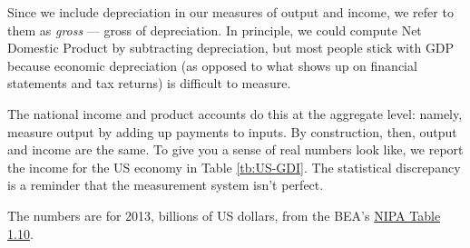 Since we include depreciation in our measures of output and income,
we refer to them as \textit{gross} --- gross of depreciation.
In principle, we could compute Net Domestic Product
by subtracting depreciation, but most people stick with GDP because
economic depreciation (as opposed to what shows up on financial
statements and tax returns) is difficult to measure.


The national income and product accounts do this at the aggregate level:
namely, measure output by adding up payments to inputs.
By construction, then, output and income are the same.
To give you a sense of real numbers look like, we report
the income for the US economy  in Table \ref{tb:US-GDI}.
The statistical discrepancy is a reminder that the measurement
system isn't perfect.

\begin{table}[!ht]
\centering
\caption{Income components of US GDP.}
\label{tb:US-GDI}

\begin{minipage}{0.7\textwidth}
\footnotesize{%
\smallskip
The numbers are for 2013, billions of US dollars,
from the BEA's
\href{http://www.bea.gov/iTable/iTableHtml.cfm?reqid=9&step=3&isuri=1&903=51}{NIPA Table 1.10}.
}
\end{minipage}
\end{table}


